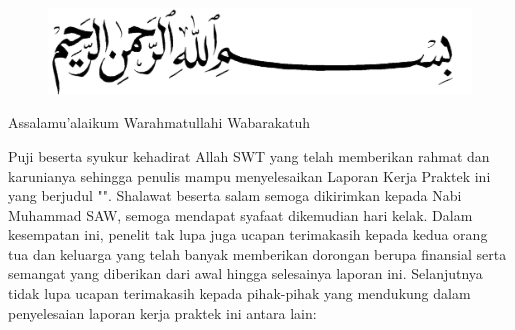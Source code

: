 %



\chapter*{\kataPengantar}
\begin{figure}
    \centering
    \includegraphics[width=0.5\linewidth]{pngwing.com (2).png}
\end{figure}

Assalamu’alaikum Warahmatullahi Wabarakatuh 
\par Puji beserta syukur kehadirat Allah SWT yang telah memberikan rahmat dan karunianya sehingga penulis mampu menyelesaikan Laporan Kerja Praktek ini yang berjudul "\judul". Shalawat beserta salam semoga dikirimkan kepada Nabi Muhammad SAW, semoga mendapat syafaat dikemudian hari kelak. Dalam kesempatan ini, penelit tak lupa juga ucapan terimakasih kepada kedua orang tua dan keluarga yang telah banyak memberikan dorongan berupa finansial serta semangat yang diberikan dari awal hingga selesainya laporan ini. Selanjutnya tidak lupa ucapan terimakasih kepada pihak-pihak yang mendukung dalam penyelesaian laporan kerja praktek ini antara lain:

